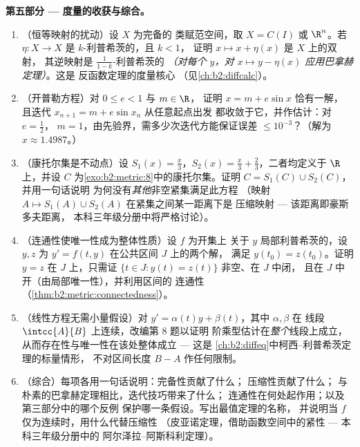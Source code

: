 \begin{problem}
\medskip
\noindent\textbf{第五部分 --- 度量的收获与综合。}
\begin{enumerate}[resume]
  \item （恒等映射的扰动）设 $X$ 为完备的
        类赋范空间，取 $X = C(I)$ 或 $\R^n$。若
        $\eta \colon X \to X$ 是 $k$-利普希茨的，且 $k < 1$，
        证明 $x \mapsto x + \eta(x)$ 是 $X$ 上的双射，
        其逆映射是 $\frac1{1-k}$-利普希茨的 \emph{（对每个
        $y$，对 $x \mapsto y - \eta(x)$ 应用巴拿赫定理）}。这是
        反函数定理的度量核心
        （见\cref{ch:b2:diffcalc}）。
  \item （开普勒方程）对 $0 \leq e < 1$ 与 $m \in \R$，
        证明 $x = m + e\sin x$ 恰有一解，
        且迭代 $x_{n+1} = m + e\sin x_n$ 从任意起点出发
        都收敛于它，并作估计：对 $e = \frac12$，
        $m = 1$，由先验界，需多少次迭代方能保证误差 $\leq
        10^{-3}$？（解为 $x
        \approx 1.4987$。）
  \item （康托尔集是不动点）设 $S_1(x) = \frac
        x3$，$S_2(x) = \frac x3 + \frac23$，二者均定义于 $\R$ 上，并设
        $C$ 为\cref{exo:b2:metric:8}中的康托尔集。证明
        $C = S_1(C) \cup S_2(C)$，并用一句话说明
        为何没有\emph{其他}非空紧集满足此方程
        （映射 $A \mapsto S_1(A) \cup S_2(A)$ 在紧集之间某一距离下是
        压缩映射 --- 该距离即豪斯多夫距离，
        本科三年级分册中将严格讨论）。
  \item （连通性使唯一性成为整体性质）设 $f$ 为开集上
        关于 $y$ 局部利普希茨的，设 $y, z$ 为
        $y' = f(t, y)$ 在公共区间 $J$ 上的两个解，
        满足 $y(t_0) = z(t_0)$。证明 $y = z$ 在 $J$ 上，只需证
        $\{t \in J : y(t) = z(t)\}$ 非空、在 $J$ 中闭，
        且在 $J$ 中开（由局部唯一性），并利用区间的
        连通性
        （\cref{thm:b2:metric:connectedness}）。
  \item （线性方程无需小量假设）对 $y' =
        \alpha(t)y + \beta(t)$，其中 $\alpha, \beta$ 在
        线段 $\intcc{A}{B}$ 上连续，改编第 8 题以证明
        阶乘型估计在\emph{整个}线段上成立，
        从而存在性与唯一性在该处整体成立 --- 这是
        \cref{ch:b2:diffeq}中柯西–利普希茨定理的标量情形，
        不对区间长度 $B - A$ 作任何限制。
  \item （综合）每项各用一句话说明：完备性贡献了什么；
        压缩性贡献了什么；
        与朴素的巴拿赫定理相比，迭代技巧带来了什么；
        连通性在何处起作用；以及第三部分中的哪个反例
        保护哪一条假设。写出最值定理的名称，
        并说明当 $f$ 仅为连续时，用什么代替压缩性
        （皮亚诺定理，借助函数空间中的紧性 --- 本科三年级分册中的
        阿尔泽拉–阿斯科利定理）。
\end{enumerate}
\end{problem}
